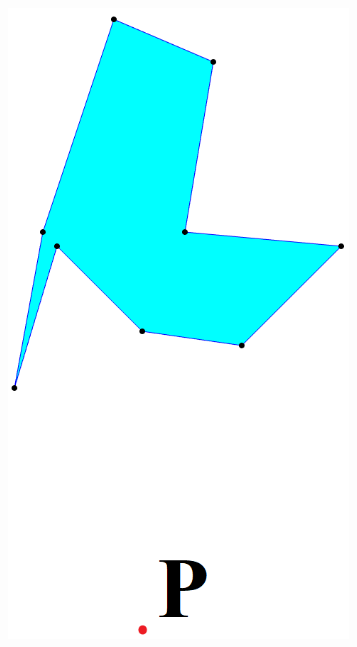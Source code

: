 \documentclass[conference]{IEEEtran}
\begin{document}
\begin{figure}[htbp]
\begin{subfigure}{0.32\linewidth}
					\includegraphics[width=0.99\textwidth]{fig2b.png}
					\caption{}
					\label{fig2b}
				\end{subfigure}
				\begin{subfigure}{0.32\linewidth}
					\centering

\end{subfigure}
\end{figure}
\end{document}
